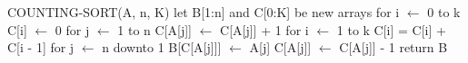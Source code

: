 \begin{pseudocode}[caption={Algoritmo de ordenação por contagem}, label={countingSortP}]
COUNTING-SORT(A, n, K)
let B[1:n] and C[0:K] be new arrays
for i $\gets$ 0 to k
    C[i] $\gets$ 0
for j $\gets$ 1 to n
    C[A[j]] $\gets$ C[A[j]] + 1
for i $\gets$ 1 to k
    C[i] = C[i] + C[i - 1]
for j $\gets$ n downto 1
    B[C[A[j]]] $\gets$ A[j]
    C[A[j]] $\gets$ C[A[j]] - 1
return B
\end{pseudocode}